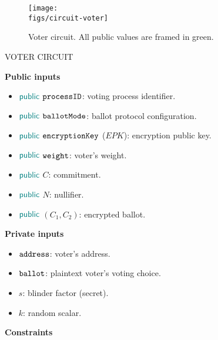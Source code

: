\begin{figure}[H]
	\centerline{\texttt{[image: \\figs/circuit-voter]}}
	\caption{Voter circuit. All public values are framed in green.}
	\label{fig:circuit-voter}
\end{figure}

\begin{mdframed}
	\begin{minipage}[H]{1\textwidth}
		\begin{spacing}{1.25}
			\vspace{0.3cm}
			\begin{center}{VOTER CIRCUIT}\end{center}
			\textbf{Public inputs}
				\begin{itemize}
					\item ${\sf\color{teal}public}$ $\texttt{processID}$: voting process identifier. 
					\item ${\sf\color{teal}public}$ $\texttt{ballotMode}$: ballot protocol configuration.
					\item ${\sf\color{teal}public}$ $\texttt{encryptionKey}$ ($EPK$): encryption public key.
					\item ${\sf\color{teal}public}$ $\texttt{weight}$: voter's weight.
					\item ${\sf\color{teal}public}$ $C$: commitment.
					\item ${\sf\color{teal}public}$ $N$: nullifier.
					\item ${\sf\color{teal}public}$ $(C_1, C_2)$: encrypted ballot. 
				\end{itemize}
			\textbf{Private inputs}
				\begin{itemize}								
					\item \private $\texttt{address}$: voter's address.
					\item \private $\texttt{ballot}$: plaintext voter's voting choice.
					\item \private $s$: blinder factor (secret).
					\item \private $k$: random scalar.
				\end{itemize}
			\textbf{Constraints} \\ \vspace{-0.4cm}		
				

\end{spacing}
\end{minipage}
\end{mdframed}
